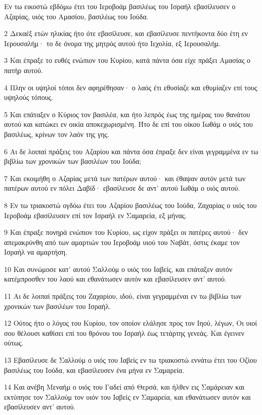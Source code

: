 \par Εν τω εικοστώ εβδόμω έτει του Ιεροβοάμ βασιλέως του Ισραήλ εβασίλευσεν ο Αζαρίας, υιός του Αμασίου, βασιλέως του Ιούδα.
\par 2 Δεκαέξ ετών ηλικίας ήτο ότε εβασίλευσε, και εβασίλευσε πεντήκοντα δύο έτη εν Ιερουσαλήμ· το δε όνομα της μητρός αυτού ήτο Ιεχολία, εξ Ιερουσαλήμ.
\par 3 Και έπραξε το ευθές ενώπιον του Κυρίου, κατά πάντα όσα είχε πράξει Αμασίας ο πατήρ αυτού.
\par 4 Πλην οι υψηλοί τόποι δεν αφηρέθησαν· ο λαός έτι εθυσίαζε και εθυμίαζεν επί τους υψηλούς τόπους.
\par 5 Και επάταξεν ο Κύριος τον βασιλέα, και ήτο λεπρός έως της ημέρας του θανάτου αυτού και κατώκει εν οικία αποκεχωρισμένη. Ήτο δε επί του οίκου Ιωθάμ ο υιός του βασιλέως, κρίνων τον λαόν της γης.
\par 6 Αι δε λοιπαί πράξεις του Αζαρίου και πάντα όσα έπραξε δεν είναι γεγραμμένα εν τω βιβλίω των χρονικών των βασιλέων του Ιούδα;
\par 7 Και εκοιμήθη ο Αζαρίας μετά των πατέρων αυτού· και έθαψαν αυτόν μετά των πατέρων αυτού εν πόλει Δαβίδ· εβασίλευσε δε αντ' αυτού Ιωθάμ ο υιός αυτού.
\par 8 Εν τω τριακοστώ ογδόω έτει του Αζαρίου βασιλέως του Ιούδα, Ζαχαρίας ο υιός του Ιεροβοάμ εβασίλευσεν επί τον Ισραήλ εν Σαμαρεία, εξ μήνας.
\par 9 Και έπραξε πονηρά ενώπιον του Κυρίου, ως είχον πράξει οι πατέρες αυτού· δεν απεμακρύνθη από των αμαρτιών του Ιεροβοάμ υιού του Ναβάτ, όστις έκαμε τον Ισραήλ να αμαρτήση.
\par 10 Και συνώμοσε κατ' αυτού Σαλλούμ ο υιός του Ιαβείς, και επάταξεν αυτόν κατέμπροσθεν του λαού και εθανάτωσεν αυτόν και εβασίλευσεν αντ' αυτού.
\par 11 Αι δε λοιπαί πράξεις του Ζαχαρίου, ιδού, είναι γεγραμμέναι εν τω βιβλίω των χρονικών των βασιλέων του Ισραήλ.
\par 12 Ούτος ήτο ο λόγος του Κυρίου, τον οποίον ελάλησε προς τον Ιηού, λέγων, Οι υιοί σου θέλουσι καθίσει επί του θρόνου του Ισραήλ έως τετάρτης γενεάς. Και έγεινεν ούτως.
\par 13 Εβασίλευσε δε Σαλλούμ ο υιός του Ιαβείς εν τω τριακοστώ εννάτω έτει του Οζίου βασιλέως του Ιούδα, και εβασίλευσεν ένα μήνα εν Σαμαρεία.
\par 14 Και ανέβη Μεναήμ ο υιός του Γαδεί από Θερσά, και ήλθεν εις Σαμάρειαν και εκτύπησε τον Σαλλούμ τον υιόν του Ιαβείς εν Σαμαρεία, και εθανάτωσεν αυτόν και εβασίλευσεν αντ' αυτού.
